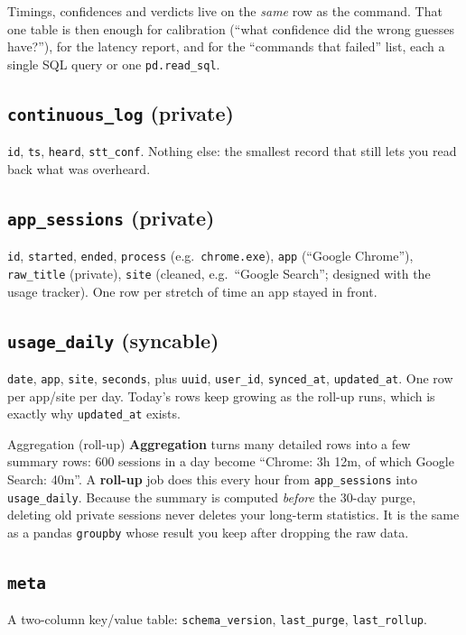 \documentclass[11pt,a4paper]{article}
\begin{document}
\begin{why}
Timings, confidences and verdicts live on the \emph{same} row as the command. That one table is
then enough for calibration (``what confidence did the wrong guesses have?''), for the latency
report, and for the ``commands that failed'' list, each a single SQL query or one
\texttt{pd.read\_sql}.
\end{why}

\subsection{\texttt{continuous\_log} (private)}
\texttt{id}, \texttt{ts}, \texttt{heard}, \texttt{stt\_conf}. Nothing else: the smallest record
that still lets you read back what was overheard.

\subsection{\texttt{app\_sessions} (private)}
\texttt{id}, \texttt{started}, \texttt{ended}, \texttt{process} (e.g.\ \texttt{chrome.exe}),
\texttt{app} (``Google Chrome''), \texttt{raw\_title} (private), \texttt{site} (cleaned, e.g.\
``Google Search''; designed with the usage tracker). One row per stretch of time an app stayed
in front.

\subsection{\texttt{usage\_daily} (syncable)}
\texttt{date}, \texttt{app}, \texttt{site}, \texttt{seconds}, plus \texttt{uuid},
\texttt{user\_id}, \texttt{synced\_at}, \texttt{updated\_at}. One row per app/site per day.
Today's rows keep growing as the roll-up runs, which is exactly why \texttt{updated\_at} exists.

\begin{concept}{Aggregation (roll-up)}
\textbf{Aggregation} turns many detailed rows into a few summary rows: 600 sessions in a day
become ``Chrome: 3h 12m, of which Google Search: 40m''. A \textbf{roll-up} job does this every
hour from \texttt{app\_sessions} into \texttt{usage\_daily}. Because the summary is computed
\emph{before} the 30-day purge, deleting old private sessions never deletes your long-term
statistics. It is the same as a pandas \texttt{groupby} whose result you keep after dropping
the raw data.
\end{concept}

\subsection{\texttt{meta}}
A two-column key/value table: \texttt{schema\_version}, \texttt{last\_purge},
\texttt{last\_rollup}.
\end{document}
